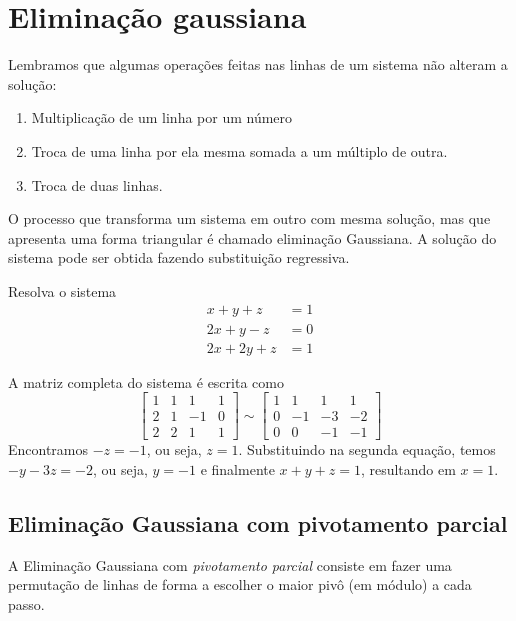 \section{Eliminação gaussiana}
Lembramos que algumas operações feitas nas linhas de um sistema não alteram a solução:
\begin{enumerate}
\item Multiplicação de um linha por um número
\item Troca de uma linha por ela mesma somada a um múltiplo de outra.
\item Troca de duas linhas.
\end{enumerate}

O processo que transforma um sistema em outro com mesma solução, mas que apresenta uma forma triangular é chamado eliminação Gaussiana. A solução do sistema pode ser obtida fazendo substituição regressiva.
\begin{ex} Resolva o sistema
  \begin{align}
    x+y+z  &=1\\
    2x+y-z &=0\\
    2x+2y+z&=1
  \end{align}
\end{ex}
\begin{sol}
A matriz completa do sistema é escrita como
\begin{equation*}
  \left[\begin{array}{ccc|c}
      1 &1& 1&1\\
      2 &1& -1&0\\
      2 & 2 &1&1
    \end{array}\right] \sim 
  \left[\begin{array}{ccc|c}
      1 &1& 1&1\\
      0 &-1& -3&-2\\
      0 & 0 &-1&-1
    \end{array}\right]
\end{equation*}
Encontramos $-z=-1$, ou seja, $z=1$. Substituindo na segunda equação, temos $-y-3z=-2$, ou seja, $y=-1$ e finalmente $x+y+z=1$, resultando em $x=1$.
\end{sol}

\subsection{Eliminação Gaussiana com pivotamento parcial}
A Eliminação Gaussiana com \emph{pivotamento parcial} consiste em fazer uma permutação de linhas de forma a escolher o maior pivô (em módulo) a cada passo.

